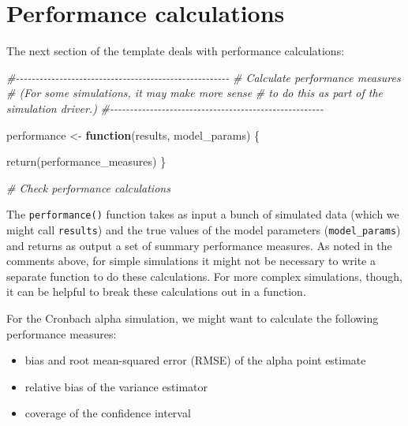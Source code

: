 \documentclass[
]{book}
\newenvironment{Shaded}{\begin{snugshade}}{\end{snugshade}}
\newcommand{\CommentTok}[1]{\textcolor[rgb]{0.56,0.35,0.01}{\textit{#1}}}
\newcommand{\ControlFlowTok}[1]{\textcolor[rgb]{0.13,0.29,0.53}{\textbf{#1}}}
\newcommand{\FunctionTok}[1]{\textcolor[rgb]{0.00,0.00,0.00}{#1}}
\newcommand{\NormalTok}[1]{#1}
\newcommand{\OtherTok}[1]{\textcolor[rgb]{0.56,0.35,0.01}{#1}}
\providecommand{\tightlist}{%
  \setlength{\itemsep}{0pt}\setlength{\parskip}{0pt}}
\begin{document}
\hypertarget{performance-calculations}{%
\section{Performance calculations}\label{performance-calculations}}

The next section of the template deals with performance calculations:

\begin{Shaded}
\begin{Highlighting}[]
\CommentTok{\#{-}{-}{-}{-}{-}{-}{-}{-}{-}{-}{-}{-}{-}{-}{-}{-}{-}{-}{-}{-}{-}{-}{-}{-}{-}{-}{-}{-}{-}{-}{-}{-}{-}{-}{-}{-}{-}{-}{-}{-}{-}{-}{-}{-}{-}{-}{-}{-}{-}{-}{-}{-}{-}{-}}
\CommentTok{\# Calculate performance measures}
\CommentTok{\# (For some simulations, it may make more sense}
\CommentTok{\# to do this as part of the simulation driver.)}
\CommentTok{\#{-}{-}{-}{-}{-}{-}{-}{-}{-}{-}{-}{-}{-}{-}{-}{-}{-}{-}{-}{-}{-}{-}{-}{-}{-}{-}{-}{-}{-}{-}{-}{-}{-}{-}{-}{-}{-}{-}{-}{-}{-}{-}{-}{-}{-}{-}{-}{-}{-}{-}{-}{-}{-}{-}}

\NormalTok{performance }\OtherTok{\textless{}{-}} \ControlFlowTok{function}\NormalTok{(results, model\_params) \{}

  \FunctionTok{return}\NormalTok{(performance\_measures)}
\NormalTok{\}}

\CommentTok{\# Check performance calculations}
\end{Highlighting}
\end{Shaded}

The \texttt{performance()} function takes as input a bunch of simulated data (which we might call \texttt{results}) and the true values of the model parameters (\texttt{model\_params}) and returns as output a set of summary performance measures. As noted in the comments above, for simple simulations it might not be necessary to write a separate function to do these calculations. For more complex simulations, though, it can be helpful to break these calculations out in a function.

For the Cronbach alpha simulation, we might want to calculate the following performance measures:

\begin{itemize}
\tightlist
\item
  bias and root mean-squared error (RMSE) of the alpha point estimate
\item
  relative bias of the variance estimator
\item
  coverage of the confidence interval
\end{itemize}
\end{document}
